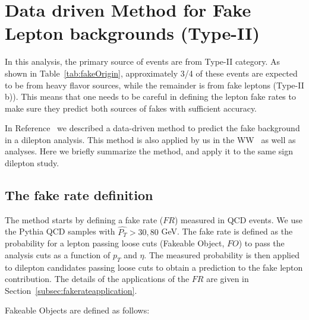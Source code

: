 \section{Data driven Method for Fake Lepton backgrounds (Type-II)}
\label{sec:leptonfake}

In this analysis, the primary source of events are from Type-II category. 
As shown in Table~\ref{tab:fakeOrigin}, approximately 3/4 of these events are expected to be from 
heavy flavor sources, while the remainder is from
fake leptons (Type-II b)). This means that one needs to be careful in defining the lepton fake rates
to make sure they predict both sources of fakes with sufficient accuracy.

In Reference~\cite{fakelep} we described a data-driven method to predict the fake 
background in a dilepton analysis. This method is also applied by us in  
the WW~\cite{ww} as well as \ttbar ~\cite{ttbar} analyses. Here we briefly
summarize the method, and apply it to the same sign dilepton study.

\subsection{The fake rate definition}
\label{subsec:fakeratedef}

The method starts by defining a fake rate ($FR$) measured in QCD events. We use 
the Pythia QCD samples with $\hat{P_T} > 30, 80 $ GeV. The fake rate is defined as 
the probability for a lepton passing loose cuts (Fakeable Object, $FO$) to pass the 
analysis cuts as a function of $p_T$ and $\eta$. The measured probability is then applied to 
dilepton candidates passing loose cuts to obtain a prediction to the fake lepton contribution. 
The details of the applications of the $FR$ are given in Section~\ref{subsec:fakerateapplication}. 

Fakeable Objects are defined as follows:

